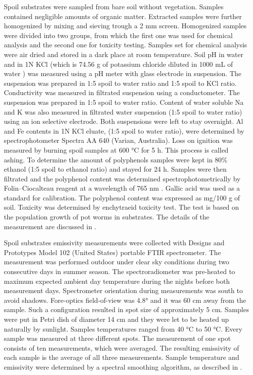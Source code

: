 Spoil substrates were sampled from bare soil without vegetation. Samples contained negligible amounts of organic matter. Extracted samples were further homogenized by mixing and sieving trough a 2 mm screen. Homogenized samples were divided into two groups, from which the first one was used for chemical analysis and the second one for toxicity testing. Samples set for chemical analysis were air dried and stored in a dark place at room temperature. Soil pH in water and in 1N KCl (which is 74.56 g of potassium chloride diluted in 1000 mL of water \cite{J03}) was measured using a pH meter with glass electrode in suspension. The suspension was prepared in 1:5 spoil to water ratio and 1:5 spoil to KCl ratio. Conductivity was measured in filtrated suspension using a conductometer. The suspension was prepared in 1:5 spoil to water ratio. Content of water soluble Na and K was also measured in filtrated water suspension (1:5 spoil to water ratio) using an ion selective electrode. Both suspensions were left to stay overnight. Al and Fe contents in 1N KCl eluate, (1:5 spoil to water ratio), were determined by spectrophotometer Spectra AA 640 (Varian, Australia). Loss on ignition was measured by burning spoil samples at 600 °C for 5 h. This process is called ashing. To determine the amount of polyphenols samples were kept in 80\% ethanol (1:5 spoil to ethanol ratio) and stayed for 24 h. Samples were then filtrated and the polyphenol content was determined spectrophotometrically by Folin–Ciocalteau reagent at a wavelength of 765 nm \cite{HL97}. Gallic acid was used as a standard for calibration. The polyphenol content was expressed as mg/100 g of soil. Toxicity was determined by enchytraeid toxicity test. The test is based on the population growth of pot worms in substrates. The details of the measurement are discussed in \cite{FK05}.

Spoil substrates emissivity measurements were collected with Designs and Prototypes Model 102 (United States) portable FTIR spectrometer. The measurement was performed outdoor under clear sky conditions during two consecutive days in summer season. The spectroradiometer was pre-heated to maximum expected ambient day temperature during the nights before both measurement days. Spectrometer orientation during measurements was south to avoid shadows. Fore-optics field-of-view was 4.8° and it was 60 cm away from the sample. Such a configuration resulted in spot size of approximately 5 cm. Samples were put in Petri dish of diameter 14 cm and they were let to be heated up naturally by sunlight. Samples temperatures ranged from 40 °C to 50 °C. Every sample was measured at three different spots. The measurement of one spot consists of ten measurements, which were averaged. The resulting emissivity of each sample is the average of all three measurements. Sample temperature and emissivity were determined by a spectral smoothing algorithm, as described in \cite{HJ98}.

